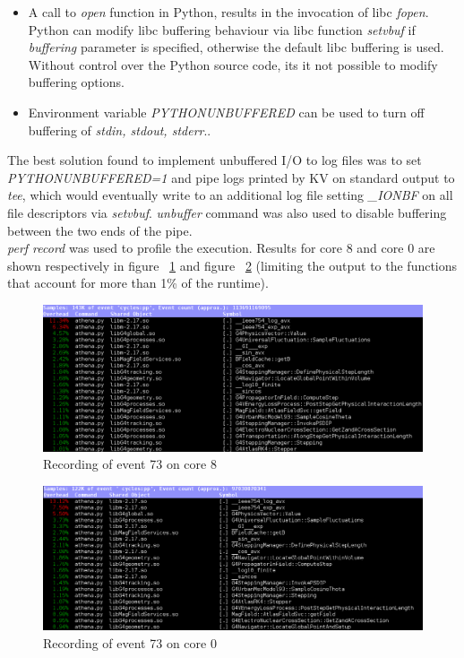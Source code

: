 \documentclass[a4paper]{jpconf}
\begin{document}
\begin{itemize}
\item A call to \textit{open} function in Python, results in the invocation
of libc \textit{fopen}. Python can modify libc buffering behaviour via libc 
function \textit{setvbuf} if \textit{buffering} parameter is specified, 
otherwise the default libc buffering is used. Without control over the Python
source code, its it not possible to modify buffering options.
\item Environment variable \textit{PYTHONUNBUFFERED} can be used to turn off
buffering of \textit{stdin, stdout, stderr}.. 
\end{itemize}
The best solution found to implement unbuffered I/O to log files was to set 
\textit{PYTHONUNBUFFERED=1} and pipe logs printed by KV on standard output to
\textit{tee}, which would eventually write to an additional log file setting 
\textit{\_IONBF} on all file descriptors via \textit{setvbuf}.
\textit{unbuffer} command was also used to disable buffering between the two
ends of the pipe. 
\\
\textit{perf record} was used to profile the execution. Results for core 8 
and core 0 are shown respectively in figure ~\ref{event-73-processor8} and 
figure ~\ref{event-73-processor0} (limiting the output to the functions that
account for more than 1\% of the runtime). 

\begin{figure}[h]
\begin{center}
\includegraphics[scale=0.45]{images/Event73_Processor8.png}
\end{center}
\caption{\label{event-73-processor8} Recording of event 73 on core 8}
\end{figure}

\begin{figure}[h]
\begin{center}
\includegraphics[scale=0.45]{images/Event73_Processor0.png}
\end{center}
\caption{\label{event-73-processor0} Recording of event 73 on core 0}
\end{figure}
\end{document}
